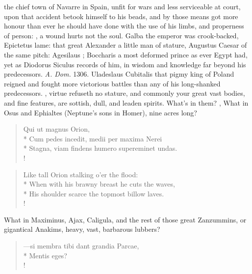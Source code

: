 {the chief town of Navarre in Spain, unfit for wars and less serviceable at court, upon that accident betook himself to his beads, and by those means got more honour than ever he should have done with the use of his limbs, and properness of person: , a wound hurts not the soul. Galba the emperor was crook-backed, Epictetus lame: that great Alexander a little man of stature, Augustus Caesar of the same pitch: Agesilaus ; Boccharis a most deformed prince as ever Egypt had, yet as Diodorus Siculus records of him, in wisdom and knowledge far beyond his predecessors. \emph{A. Dom.} 1306. Uladeslaus Cubitalis that pigmy king of Poland reigned and fought more victorious battles than any of his long-shanked predecessors. , virtue refuseth no stature, and commonly your great vast bodies, and fine features, are sottish, dull, and leaden spirits. What's in them? , What in Osus and Ephialtes (Neptune's sons in Homer), nine acres long?

\begin{latin}%
\begin{verse}%
Qui ut magnus Orion,\\*
Cum pedes incedit, medii per maxima Nerei\\*
Stagna, viam findens humero supereminet undas.\\!
\end{verse}%
\end{latin}%
\translationrule%
\begin{verse}%
Like tall Orion stalking o'er the flood:\\*
When with his brawny breast he cuts the waves,\\*
His shoulder scarce the topmost billow laves.\\!
\end{verse}%
%

What in Maximinus, Ajax, Caligula, and the rest of those great Zanzummins, or gigantical Anakims, heavy, vast, barbarous lubbers?

\begin{latin}%
\begin{verse}%
---si membra tibi dant grandia Parcae,\\*
Mentis eges?\\!
\end{verse}%
\end{latin}%
%

}
